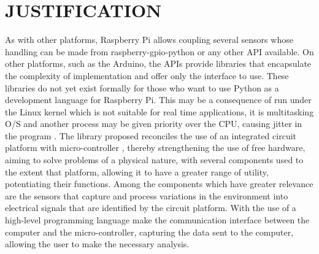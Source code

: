 \documentclass{acm_proc_article-sp}
\begin{document}
\section{JUSTIFICATION}
\label{sec:justification}
As with other platforms, Raspberry Pi allows coupling several sensors whose handling can be made from raspberry-gpio-python or any other API available. On other platforms, such as the Arduino, the APIs provide libraries that encapsulate the complexity of implementation and offer only the interface to use. These libraries do not yet exist formally for those who want to use Python as a development language for Raspberry Pi.
\newline
\newline
This may be a consequence of run under the Linux kernel which is not suitable for real time applications, it is multitasking O/S and another process may be given priority over the CPU, causing jitter in the program \cite{Oracle}.
\newline
\newline
The library proposed reconciles the use of an integrated circuit platform with micro-controller , thereby strengthening the use of free hardware, aiming to solve problems of a physical nature, with several components used to the extent that platform, allowing it to have a greater range of utility, potentiating their functions.
Among the components which have greater relevance are the sensors that capture and process variations in the environment into electrical signals that are identified by the circuit platform. With the use of a high-level programming language make the communication interface between the computer and the micro-controller, capturing the data sent to the computer, allowing the user to make the necessary analysis.
\end{document}
